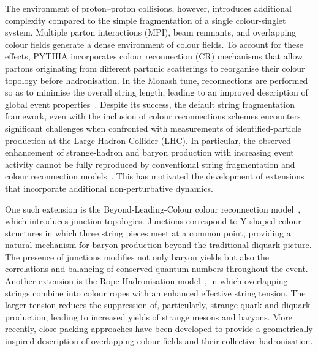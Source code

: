 The environment of proton--proton collisions, however, introduces additional complexity compared to the simple fragmentation of a single colour-singlet system. Multiple parton interactions (MPI), beam remnants, and overlapping colour fields generate a dense environment of colour fields. To account for these effects, PYTHIA incorporates colour reconnection (CR) mechanisms that allow partons originating from different partonic scatterings to reorganise their colour topology before hadronisation. In the Monash tune, reconnections are performed so as to minimise the overall string length, leading to an improved description of global event properties~\cite{Bierlich:2015rha}. Despite its success, the default string fragmentation framework, even with the inclusion of colour reconnections schemes encounters significant challenges when confronted with measurements of identified-particle production at the Large Hadron Collider (LHC). In particular, the observed enhancement of strange-hadron and baryon production with increasing event activity cannot be fully reproduced by conventional string fragmentation and colour reconnection models~\cite{ALICE:2016fzo}. This has motivated the development of extensions that incorporate additional non-perturbative dynamics.

One such extension is the Beyond-Leading-Colour colour reconnection model~\cite{Christiansen:2015yqa}, which introduces junction topologies. Junctions correspond to Y-shaped colour structures in which three string pieces meet at a common point, providing a natural mechanism for baryon production beyond the traditional diquark picture. The presence of junctions modifies not only baryon yields but also the correlations and balancing of conserved quantum numbers throughout the event. Another extension is the Rope Hadronisation model~\cite{Bierlich:2015rha}, in which overlapping strings combine into colour ropes with an enhanced effective string tension. The larger tension reduces the suppression of, particularly, strange quark and diquark production, leading to increased yields of strange mesons and baryons. More recently, close-packing approaches have been developed to provide a geometrically inspired description of overlapping colour fields and their collective hadronisation.

